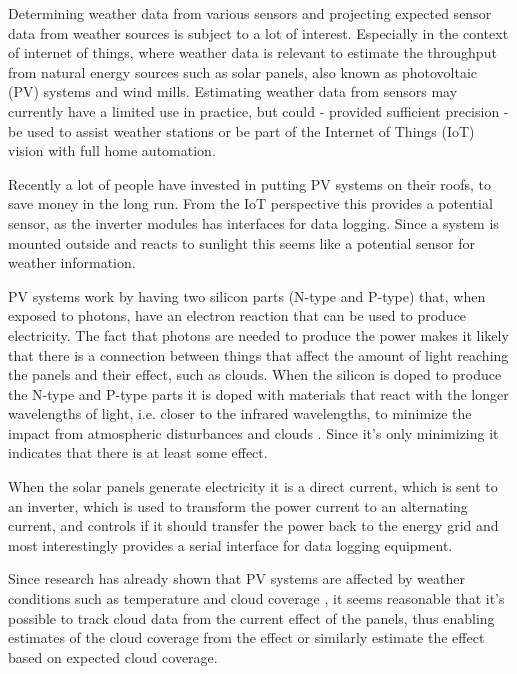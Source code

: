 Determining weather data from various sensors and projecting expected
sensor data from weather sources is subject to a lot of interest.
Especially in the context of internet of things, where weather data is
relevant to estimate the throughput from natural energy sources such
as solar panels, also known as photovoltaic (PV) systems and wind
mills.  Estimating weather data from sensors may currently have a
limited use in practice, but could - provided sufficient precision -
be used to assist weather stations or be part of the Internet of
Things (IoT) vision with full home automation.

Recently a lot of people have invested in putting PV systems on their
roofs, to save money in the long run.  From the IoT perspective this
provides a potential sensor, as the inverter modules has
interfaces for data logging.  Since a system is mounted outside and
reacts to sunlight this seems like a potential sensor for weather
information.

PV systems work by having two silicon parts (N-type and P-type) that,
when exposed to photons, have an electron reaction that can be used to
produce electricity.  The fact that photons are needed to produce the
power makes it likely that there is a connection between things that
affect the amount of light reaching the panels and their effect, such
as clouds.  When the silicon is doped to produce the N-type and P-type
parts it is doped with materials that react with the longer
wavelengths of light, i.e. closer to the infrared wavelengths, to
minimize the impact from atmospheric disturbances and clouds
\citep{photovoltaic}.  Since it's only minimizing it indicates that
there is at least some effect.

When the solar panels generate electricity it is a direct current,
which is sent to an inverter, which is used to transform the power current to
an alternating current, and controls if it should transfer the power back
to the energy grid and most interestingly provides a serial interface
for data logging equipment.

Since research has already shown that PV systems are affected by
weather conditions such as temperature and cloud coverage
\citep{mppt2004,southafrica,cloudTrack}, it seems reasonable that it's
possible to track cloud data from the current effect of the panels,
thus enabling estimates of the cloud coverage from the effect or
similarly estimate the effect based on expected cloud coverage.

